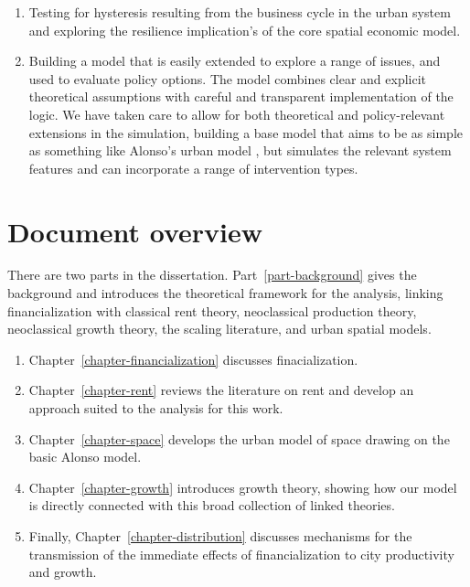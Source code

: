 \begin{enumerate}
    \item Testing for \gls{hysteresis} resulting from the business cycle in the urban system and exploring the \gls{resilience} implication's of the core spatial economic model.

    \item Building a model that is easily extended to explore a range of issues, and used to evaluate policy options. The model combines clear and explicit theoretical assumptions with careful and transparent implementation of the logic. We have taken care to allow for both theoretical and policy-relevant extensions in the simulation,  building a base model that aims to be as simple as something like Alonso's urban model \cite{alonsoLocationLandUse1964}, but simulates the relevant system features and can incorporate a range of intervention types. 
\end{enumerate}

\section{Document overview}
There are two parts in the dissertation. Part~\ref{part-background} gives the background and introduces the theoretical framework for the analysis, linking financialization with classical rent theory, neoclassical production theory, neoclassical growth theory, the scaling literature, and urban spatial models. 

\begin{enumerate}
    \item Chapter~\ref{chapter-financialization} discusses finacialization.

    \item Chapter~\ref{chapter-rent} reviews the literature on rent and develop an approach suited to the analysis for this work.

    \item Chapter~\ref{chapter-space} develops the urban model of space drawing on the basic Alonso model.

    \item Chapter~\ref{chapter-growth} introduces growth theory, showing how our model is directly connected with this broad collection of linked theories. 

    \item Finally, Chapter~\ref{chapter-distribution} discusses mechanisms for the transmission of the immediate effects of financialization to city productivity and growth.
\end{enumerate}
 
